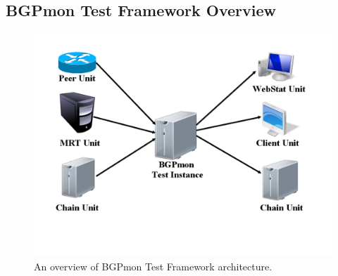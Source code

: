 

  





\subsection{BGPmon Test Framework Overview}
\label{sec:current}

\begin{figure}
\centering
\includegraphics[scale=0.40]{figs/BGPmon-framework-design.png}
\caption{An overview of BGPmon Test Framework architecture.}
\label{designfig}
\end{figure}


